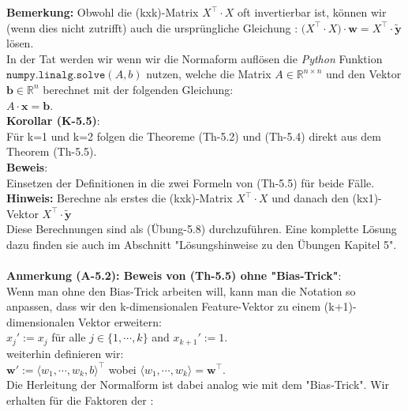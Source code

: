 \documentclass[12pt]{article}
\begin{document}
%
\textbf{Bemerkung:}
Obwohl die (kxk)-Matrix $X^\top \cdot X$ oft invertierbar ist, können wir (wenn dies nicht zutrifft) auch die ursprüngliche Gleichung : $ \bigl(X^\top \cdot X\bigr) \cdot \mathbf{w} = X^\top \cdot \mathbf{\widetilde{y}}$ lösen.\\[0.2cm]
In der Tat werden wir wenn wir die Normaform auflösen die  \textsl{Python} Funktion $\texttt{numpy.linalg.solve}(A,b)$ nutzen, welche die Matrix $A \in \mathbb{R}^{n \times n}$ und den Vektor $\mathbf{b} \in \mathbb{R}^n$ berechnet mit der folgenden Gleichung:
\\[0.2cm]
\hspace*{5.3cm}
$A \cdot \mathbf{x} = \mathbf{b}$. \\[0.5cm]
%
\textbf{Korollar (K-5.5)}:\\ 
Für k=1 und k=2 folgen die Theoreme (Th-5.2) und (Th-5.4) direkt aus dem Theorem (Th-5.5).\\
%
\textbf{Beweis}:\\
Einsetzen der Definitionen in die zwei Formeln von (Th-5.5) für beide Fälle. \\
\textbf{Hinweis:} Berechne als erstes die (kxk)-Matrix $X^\top \cdot X$ und danach den (kx1)-Vektor $ X^\top \cdot \mathbf{\widetilde{y}} $ \\
Diese Berechnungen sind als (Übung-5.8) durchzuführen. Eine komplette Lösung dazu finden sie auch im Abschnitt "Lösungshinweise zu den Übungen Kapitel 5".\\
%
\\[0.3cm]    
\textbf{Anmerkung (A-5.2): Beweis von (Th-5.5) ohne "Bias-Trick"}: \\[0.2cm] 
Wenn man ohne den Bias-Trick arbeiten will, kann man die Notation so anpassen, dass wir den k-dimensionalen Feature-Vektor zu einem (k+1)-dimensionalen Vektor erweitern:\\[0.2cm]
\hspace*{1.3cm}
$x_j' := x_j$ \quad für alle $j \in \{1,\cdots,k\} $ \quad and \quad $x_{k+1}' := 1$.
\\[0.2cm]
weiterhin definieren wir:
\\[0.2cm]
\hspace*{1.3cm}
$\mathbf{w}' := \langle w_1, \cdots, w_k, b \rangle^\top$ \quad wobei $\langle w_1, \cdots, w_k \rangle = \mathbf{w}^\top$.
\\[0.2cm]
Die Herleitung der Normalform ist dabei analog wie mit dem "Bias-Trick". Wir erhalten für die Faktoren der {\color{blue}{Normalform}}:
\\[0.4cm]
\hspace*{-0.3cm}
\end{document}
